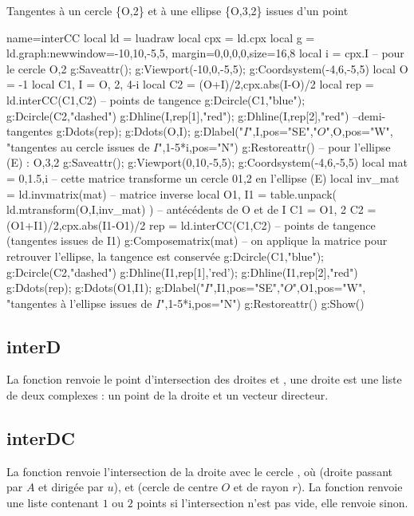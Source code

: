 \begin{demo}{Tangentes à un cercle \{O,2\} et à une ellipse \{O,3,2\} issues d'un point}
\begin{luadraw}{name=interCC}
local ld = luadraw
local cpx = ld.cpx
local g = ld.graph:new{window={-10,10,-5,5}, margin={0,0,0,0},size={16,8}}
local i = cpx.I
-- pour le cercle {O,2}
g:Saveattr(); g:Viewport(-10,0,-5,5); g:Coordsystem(-4,6,-5,5)
local O = -1
local C1, I = {O, 2}, 4-i
local C2 = {(O+I)/2,cpx.abs(I-O)/2}
local rep = ld.interCC(C1,C2) -- points de tangence
g:Dcircle(C1,"blue"); g:Dcircle(C2,"dashed")
g:Dhline(I,rep[1],"red"); g:Dhline(I,rep[2],"red") --demi-tangentes
g:Ddots(rep); g:Ddots({O,I}); g:Dlabel("$I$",I,{pos="SE"},"$O$",O,{pos="W"},
  "tangentes au cercle issues de $I$",1-5*i,{pos="N"})
g:Restoreattr()
-- pour l'ellipse (E) : {O,3,2}
g:Saveattr(); g:Viewport(0,10,-5,5); g:Coordsystem(-4,6,-5,5)
local mat = {0,1.5,i} -- cette matrice transforme un cercle {01,2} en l'ellipse (E)
local inv_mat = ld.invmatrix(mat) -- matrice inverse
local O1, I1 = table.unpack( ld.mtransform({O,I},inv_mat) ) -- antécédents de O et de I
C1 = {O1, 2}
C2 = {(O1+I1)/2,cpx.abs(I1-O1)/2}
rep = ld.interCC(C1,C2) -- points de tangence (tangentes issues de I1)
g:Composematrix(mat) -- on applique la matrice pour retrouver l'ellipse, la tangence est conservée
g:Dcircle(C1,"blue"); g:Dcircle(C2,"dashed")
g:Dhline(I1,rep[1],'red'); g:Dhline(I1,rep[2],"red")
g:Ddots(rep); g:Ddots({O1,I1}); g:Dlabel("$I$",I1,{pos="SE"},"$O$",O1,{pos="W"},
  "tangentes à l'ellipse issues de $I$",1-5*i,{pos="N"})
g:Restoreattr()
g:Show()
\end{luadraw}
\end{demo}

\subsection{interD}
La fonction  renvoie le point d'intersection des droites  et , une droite est une liste de deux complexes : un point de la droite et un vecteur directeur.

\subsection{interDC}
La fonction  renvoie l'intersection de la droite  avec le cercle , où  (droite passant par $A$ et dirigée par $u$), et  (cercle de centre $O$ et de rayon $r$). La fonction renvoie une liste contenant $1$ ou $2$ points  si l'intersection n'est pas vide, elle renvoie \nil sinon.


